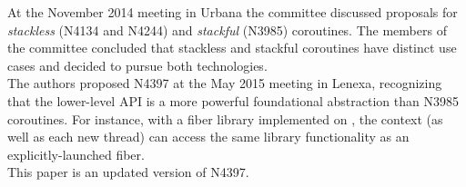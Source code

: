 At the November 2014 meeting in Urbana the committee discussed proposals for
\emph{stackless} (N4134\cite{N4134} and N4244\cite{N4244}) and \emph{stackful}
(N3985\cite{N3985}) coroutines. The members of the committee concluded that
stackless and stackful coroutines have distinct use cases and decided to pursue
both technologies.\\
\newline
The authors proposed N4397\cite{N4397} at the May 2015 meeting in Lenexa,
recognizing that the lower-level  API is a more
powerful foundational abstraction than N3985 coroutines. For instance, with a
fiber library implemented on , the 
context (as well as each new thread) can access the same library functionality
as an explicitly-launched fiber.\\
\newline
This paper is an updated version of N4397.
